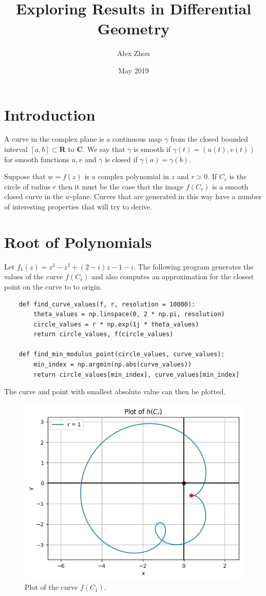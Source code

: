 \documentclass{article}
\title{Exploring Results in Differential Geometry}
\author{Alex Zhou}
\date{May 2019}
\begin{document}
\maketitle

\section{Introduction}

A curve in the complex plane is a continuous map \(\gamma\) from the closed bounded interval \([a,b] \subset \mathbf{R}\) to \(\mathbf{C}\). We say that \(\gamma\) is smooth if \(\gamma(t) = (u(t), v(t))\) for smooth functions \(u, v\) and \(\gamma\) is closed if \(\gamma(a) = \gamma(b)\).

Suppose that \(w = f(z)\) is a complex polynomial in \(z\) and  \(r > 0\). If \(C_r\) is the circle of radius \(r\) then it must be the case that the image \(f(C_r)\) is a smooth closed curve in the \(w\)-plane. Curves that are generated in this way have a number of interesting properties that will try to derive.

\section{Root of Polynomials}

Let \(f_1(z) = z^3 - z^2 + (2 - i)z - 1 - i\). The following program generates the values of the curve \(f(C_r)\) and also computes an approximation for the closest point on the curve to to origin.

\begin{verbatim}
    def find_curve_values(f, r, resolution = 10000):
        theta_values = np.linspace(0, 2 * np.pi, resolution)
        circle_values = r * np.exp(1j * theta_values)
        return circle_values, f(circle_values)
    
    def find_min_modulus_point(circle_values, curve_values):
        min_index = np.argmin(np.abs(curve_values))
        return circle_values[min_index], curve_values[min_index]
\end{verbatim}

The curve and point with smallest absolute value can then be plotted.

\begin{figure}
    \centering
    \includegraphics[width=0.75\linewidth]{images/curvef1.png}
    \caption{Plot of the curve \(f(C_1)\).}
\end{figure}
\end{document}
